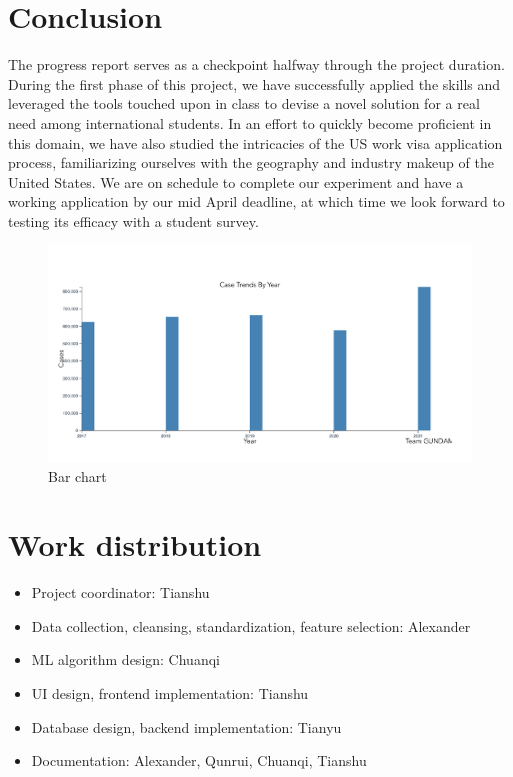 \documentclass[sigconf]{acmart}
\begin{document}
\section{Conclusion}

The progress report serves as a checkpoint halfway through the project duration. During the first phase of this project, 
we have successfully applied the skills and leveraged the tools touched upon in class to devise a novel solution for a 
real need among international students. In an effort to quickly become proficient in this domain, we have also studied 
the intricacies of the US work visa application process, familiarizing ourselves with the geography and industry makeup 
of the United States. 
We are on schedule to complete our experiment and have a working application by our mid April deadline, at which time we 
look forward to testing its efficacy with a student survey. 


\begin{figure}
  \includegraphics[width=\linewidth]{fig3.png}
  \caption{Bar chart}
  \label{fig:barchart}
\end{figure}


\appendix

\section{Work distribution}

\begin{itemize}
	\item Project coordinator: Tianshu
	\item Data collection, cleansing, standardization, feature selection: Alexander
	\item ML algorithm design: Chuanqi 
	\item UI design, frontend implementation: Tianshu
	\item Database design, backend implementation: Tianyu
	\item Documentation: Alexander, Qunrui, Chuanqi, Tianshu
	
\end{itemize}
\end{document}
